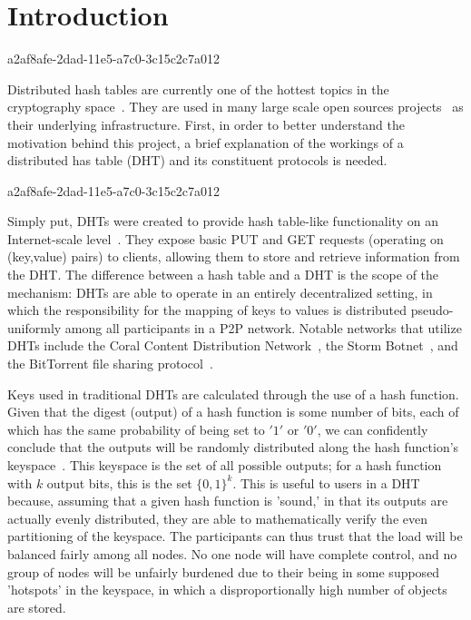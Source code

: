 \documentclass[12pt]{article}
\begin{document}
\section{Introduction}
a2af8afe-2dad-11e5-a7c0-3c15c2c7a012\par Distributed hash tables are currently one of the hottest topics in the cryptography space~\cite{Stoica:2001dj,Rowstron:2001ea,Ratnasamy:2001wn}. They are used in many large scale open sources projects~\cite{Freitas:2013tb,Xu:2010vs,Perfitt:2010fh} as their underlying infrastructure. First, in order to better understand the motivation behind this project, a brief explanation of the workings of a distributed has table (DHT) and its constituent protocols is needed.

a2af8afe-2dad-11e5-a7c0-3c15c2c7a012\par Simply put, DHTs were created to provide hash table-like functionality on an Internet-scale level~\cite{Ratnasamy:2001wn}. They expose basic PUT and GET requests (operating on (key,value) pairs) to clients, allowing them to store and retrieve information from the DHT. The difference between a hash table and a DHT is the scope of the mechanism: DHTs are able to operate in an entirely decentralized setting, in which the responsibility for the mapping of keys to values is distributed pseudo-uniformly among all participants in a P2P network. Notable networks that utilize DHTs include the Coral Content Distribution Network~\cite{Freedman:2004vb}, the Storm Botnet~\cite{Holz:2008uk}, and the BitTorrent file sharing protocol~\cite{Cohen:y1_8mBnw}.

\par Keys used in traditional DHTs are calculated through the use of a hash function. Given that the digest (output) of a hash function is some number of bits, each of which has the same probability of being set to $'1'$ or $'0'$, we can confidently conclude that the outputs will be randomly distributed along the hash function's keyspace~. This keyspace is the set of all possible outputs; for a hash function with $k$ output bits, this is the set $\{0,1\}^k$. This is useful to users in a DHT because, assuming that a given hash function is 'sound,' in that its outputs are actually evenly distributed, they are able to mathematically verify the even partitioning of the keyspace. The participants can thus trust that the load will be balanced fairly among all nodes. No one node will have complete control, and no group of nodes will be unfairly burdened due to their being in some supposed 'hotspots' in the keyspace, in which a disproportionally high number of objects are stored.~
\end{document}
